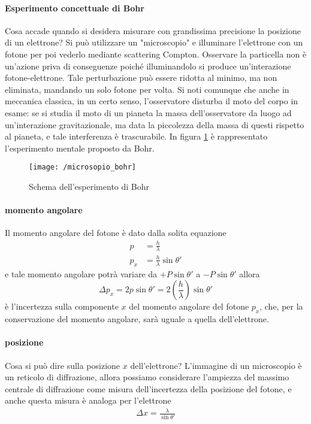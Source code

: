 \paragraph{Esperimento concettuale di Bohr}
Cosa accade quando si desidera misurare con grandissima precisione la posizione di un elettrone?
Si può utilizzare un "microscopio" e illuminare l'elettrone con un fotone per poi vederlo mediante scattering Compton.
Osservare la particella non è un'azione priva di conseguenze poiché illuminandolo si produce un'interazione fotone-elettrone.
Tale perturbazione può essere ridotta al minimo, ma non eliminata, mandando un solo fotone per volta.
Si noti comunque che anche in meccanica classica, in un certo senso, l'osservatore disturba il moto del corpo in esame: se si studia il moto di un pianeta la massa dell'osservatore da luogo ad un'interazione gravitazionale,
ma data la piccolezza della massa di questi rispetto al pianeta, e tale interferenza è trascurabile.
In figura \ref{esp_bohr} è rappresentato l'esperimento mentale proposto da Bohr.
\begin{figure}[h]
\centering
\texttt{[image: /microsopio\_bohr]}
\caption{Schema dell'esperimento di Bohr}
\label{esp_bohr}
\end{figure}

\paragraph{momento angolare} Il momento angolare del fotone è dato dalla solita equazione
\begin{equation}
\begin{split}
p & = \frac{h}{\lambda} \\
p_x & = \frac{h}{\lambda} \sin\theta'
\end{split}
\end{equation}
e tale momento angolare potrà variare da $+P\sin \theta '$ a $-P \sin \theta '$ allora
\begin{equation}
\Delta p_x = 2p \sin \theta ' = 2(\frac{h }{\lambda }) \sin \theta '
\end{equation}
è l'incertezza sulla componente $x$ del momento angolare del fotone $p_x$, che, per la conservazione del momento angolare, sarà uguale a quella dell'elettrone.

\paragraph{posizione} Cosa si può dire sulla posizione $x$ dell'elettrone?
L'immagine di un microscopio è un reticolo di diffrazione, allora possiamo considerare l'ampiezza del massimo centrale di diffrazione come misura dell'incertezza della posizione del fotone, e anche questa misura è analoga per l'elettrone
\begin{equation}
\begin{split}
\Delta x = \frac{\lambda}{\sin \theta '}
\end{split}
\end{equation}

